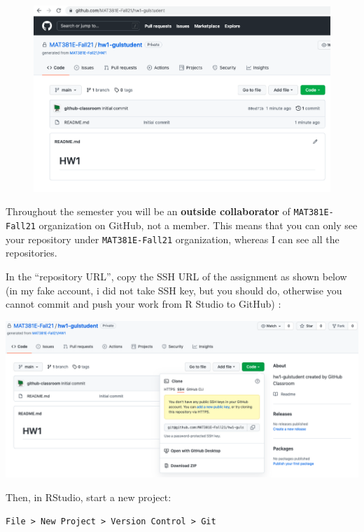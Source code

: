 \documentclass[
  12pt,
]{article}
\begin{document}
\begin{figure}
\includegraphics[width=1\linewidth]{images/github_gulstudent2} \end{figure}

Throughout the semester you will be an \textbf{outside collaborator} of
\texttt{MAT381E-Fall21} organization on GitHub, not a member. This means
that you can only see your repository under \texttt{MAT381E-Fall21}
organization, whereas I can see all the repositories.

In the ``repository URL'', copy the SSH URL of the assignment as shown
below (in my fake account, i did not take SSH key, but you should do,
otherwise you cannot commit and push your work from R Studio to GitHub)
:

\includegraphics[width=1\linewidth]{images/green}

Then, in RStudio, start a new project:

\texttt{File\ \textgreater{}\ New\ Project\ \textgreater{}\ Version\ Control\ \textgreater{}\ Git}
\end{document}
